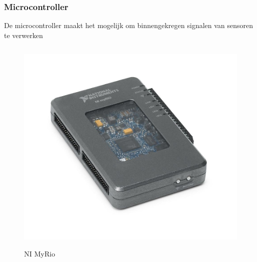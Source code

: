 \documentclass
   [kulak] %
   {kulakbeamer}
\begin{document}
\begin{frame}
\end{frame}



\begin{frame}
	\frametitle{Microcontroller}
	De microcontroller maakt het mogelijk om binnengekregen signalen van sensoren te verwerken
	\begin{columns}
		\begin{figure}
			\centering
			\includegraphics[width=.7\textwidth]{NI-myrio}
			\caption{NI MyRio}\cite{nimyrio}
		\end{figure}
	\end{columns}
	
\end{frame}
\end{document}
